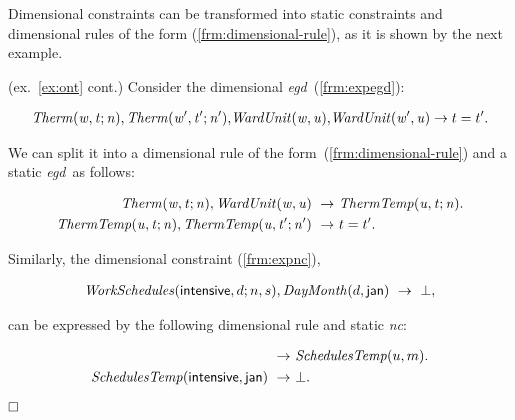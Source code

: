 \documentclass[format=acmsmall, review=false, screen=true]{acmart}
\newcommand{\boxtheorem}{\ensuremath{\hfill \Box}}
\newcommand{\nit}[1]{{\it #1}}
\newcommand{\nc}{{\em nc}}
\newcommand{\egd}{{\em egd}}
\begin{document}
{Dimensional constraints can be transformed into static constraints and dimensional rules of the form (\ref{frm:dimensional-rule}), as it is shown by the next example.

\begin{example} \label{ex:ndim} (ex.~\ref{ex:ont} cont.) Consider the dimensional \egd \ (\ref{frm:expegd}):

\vspace{-4mm}
\begin{align*}
  {\it Therm(w,t;n)},{\it Therm(w',t';n')},\!{\it WardUnit(w,u)},\!{\it WardUnit(w',u)} \rightarrow t=t'.
\end{align*}
\vspace{-4mm}

\noindent We can split it into a dimensional rule of the form~(\ref{frm:dimensional-rule}) and a static \egd \ as follows:

\vspace{-4mm}
\begin{align*}
{\it Therm(w,t;n)},{\it WardUnit(w,u)} ~\rightarrow~& {\it ThermTemp(u,t;n)}.\\
{\it ThermTemp(u,t;n)},{\it ThermTemp(u,t';n')} ~\rightarrow~& t=t'.
\end{align*}
\vspace{-4mm}

\noindent Similarly, the dimensional constraint (\ref{frm:expnc}),

\vspace{-4mm}
\begin{align*}
\nit{WorkSchedules}({\sf intensive},d;n,s),\nit{DayMonth}(d,{\sf jan})  ~\rightarrow~ \bot,
\end{align*}
\vspace{-4mm}

\noindent can be expressed by the following dimensional rule and static \nc:

\vspace{-4mm}
\begin{align*}
[\nit{WorkSchedules}(u,d;n,s),\!{\it WardUnit}(w,u),\hspace{1.5cm}&\\
{\it DayMonth}(d,m)]~\rightarrow&~ {\it SchedulesTemp}(u,m).\\
{\it SchedulesTemp}({\sf intensive},{\sf jan}) ~\rightarrow&~ \bot.
\end{align*}

\vspace*{-5mm}
\boxtheorem
\end{example}

}
\end{document}
